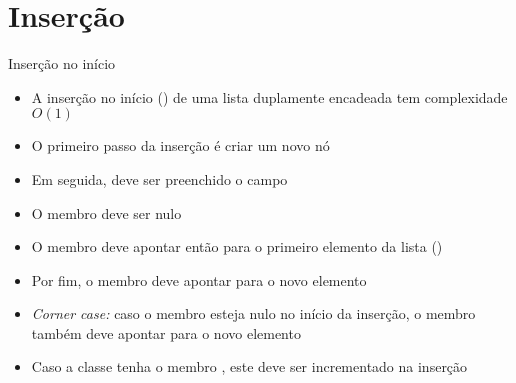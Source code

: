 \section{Inserção}

\begin{frame}[fragile]{Inserção no início}

    \begin{itemize}
        \item A inserção no início () de uma lista duplamente encadeada tem
            complexidade $O(1)$

        \item O primeiro passo da inserção é criar um novo nó

        \item Em seguida, deve ser preenchido o campo 

        \item O membro  deve ser nulo

        \item O membro  deve apontar então para o primeiro elemento da lista
        ()

        \item Por fim, o membro  deve apontar para o novo elemento

        \item \textit{Corner case:} caso o membro  esteja nulo no início da 
            inserção, o membro  também deve apontar para o novo elemento

        \item Caso a classe tenha o membro , este deve ser incrementado
            na inserção
    \end{itemize}

\end{frame}

